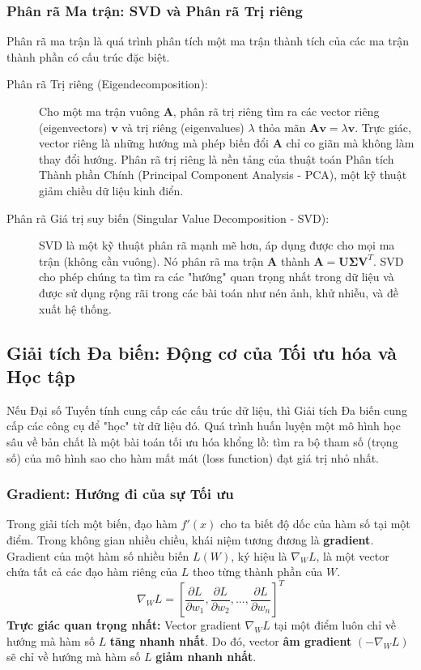 \subsubsection{Phân rã Ma trận: SVD và Phân rã Trị riêng}
Phân rã ma trận là quá trình phân tích một ma trận thành tích của các ma trận thành phần có cấu trúc đặc biệt.
\begin{description}
    \item[Phân rã Trị riêng (Eigendecomposition):] Cho một ma trận vuông $\mathbf{A}$, phân rã trị riêng tìm ra các vector riêng (eigenvectors) $\mathbf{v}$ và trị riêng (eigenvalues) $\lambda$ thỏa mãn $\mathbf{A}\mathbf{v} = \lambda\mathbf{v}$. Trực giác, vector riêng là những hướng mà phép biến đổi $\mathbf{A}$ chỉ co giãn mà không làm thay đổi hướng. Phân rã trị riêng là nền tảng của thuật toán Phân tích Thành phần Chính (Principal Component Analysis - PCA), một kỹ thuật giảm chiều dữ liệu kinh điển.
    \item[Phân rã Giá trị suy biến (Singular Value Decomposition - SVD):] SVD là một kỹ thuật phân rã mạnh mẽ hơn, áp dụng được cho mọi ma trận (không cần vuông). Nó phân rã ma trận $\mathbf{A}$ thành $\mathbf{A} = \mathbf{U}\mathbf{\Sigma}\mathbf{V}^T$. SVD cho phép chúng ta tìm ra các "hướng" quan trọng nhất trong dữ liệu và được sử dụng rộng rãi trong các bài toán như nén ảnh, khử nhiễu, và đề xuất hệ thống.
\end{description}

\subsection{Giải tích Đa biến: Động cơ của Tối ưu hóa và Học tập}

Nếu Đại số Tuyến tính cung cấp các cấu trúc dữ liệu, thì Giải tích Đa biến cung cấp các công cụ để "học" từ dữ liệu đó. Quá trình huấn luyện một mô hình học sâu về bản chất là một bài toán tối ưu hóa khổng lồ: tìm ra bộ tham số (trọng số) của mô hình sao cho hàm mất mát (loss function) đạt giá trị nhỏ nhất.

\subsubsection{Gradient: Hướng đi của sự Tối ưu}
Trong giải tích một biến, đạo hàm $f'(x)$ cho ta biết độ dốc của hàm số tại một điểm. Trong không gian nhiều chiều, khái niệm tương đương là \textbf{gradient}.
Gradient của một hàm số nhiều biến $L(W)$, ký hiệu là $\nabla_W L$, là một vector chứa tất cả các đạo hàm riêng của $L$ theo từng thành phần của $W$.
\begin{equation}
    \nabla_W L = \left[ \frac{\partial L}{\partial w_1}, \frac{\partial L}{\partial w_2}, \dots, \frac{\partial L}{\partial w_n} \right]^T
\end{equation}
\textbf{Trực giác quan trọng nhất:} Vector gradient $\nabla_W L$ tại một điểm luôn chỉ về hướng mà hàm số $L$ \textbf{tăng nhanh nhất}. Do đó, vector \textbf{âm gradient} $(-\nabla_W L)$ sẽ chỉ về hướng mà hàm số $L$ \textbf{giảm nhanh nhất}.

